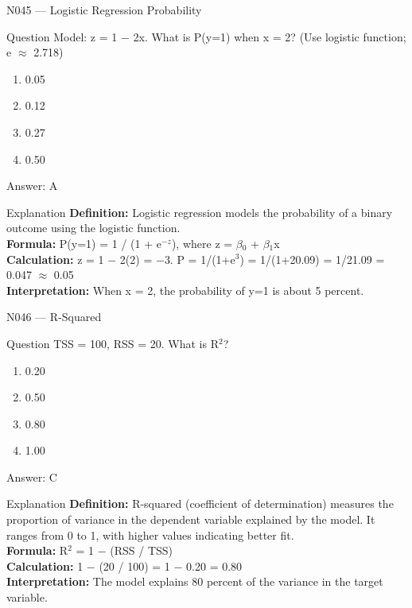 \documentclass[aspectratio=169,8pt]{beamer}
\begin{document}
	\begin{frame}{N045 --- Logistic Regression Probability}
		\begin{block}{Question}
			Model: z = 1 $-$ 2x. What is P(y=1) when x = 2? (Use logistic function; e $\approx$ 2.718)
			\begin{enumerate}
				\item 0.05
				\item 0.12
				\item 0.27
				\item 0.50
			\end{enumerate}
		\end{block}
		\begin{exampleblock}{Answer: A}\end{exampleblock}
		\begin{block}{Explanation}
			\textbf{Definition:} Logistic regression models the probability of a binary outcome using the logistic function.\\
			\textbf{Formula:} P(y=1) = 1 / (1 + e$^{-z}$), where z = $\beta$$_{0}$ + $\beta$$_{1}$x\\
			\textbf{Calculation:} z = 1 $-$ 2(2) = $-$3. P = 1/(1+e$^{3}$) = 1/(1+20.09) = 1/21.09 = 0.047 $\approx$ 0.05\\
			\textbf{Interpretation:} When x = 2, the probability of y=1 is about 5 percent.
		\end{block}
	\end{frame}
	
	\begin{frame}{N046 --- R-Squared}
		\begin{block}{Question}
			TSS = 100, RSS = 20. What is R$^{2}$?
			\begin{enumerate}
				\item 0.20
				\item 0.50
				\item 0.80
				\item 1.00
			\end{enumerate}
		\end{block}
		\begin{exampleblock}{Answer: C}\end{exampleblock}
		\begin{block}{Explanation}
			\textbf{Definition:} R-squared (coefficient of determination) measures the proportion of variance in the dependent variable explained by the model. It ranges from 0 to 1, with higher values indicating better fit.\\
			\textbf{Formula:} R$^{2}$ = 1 $-$ (RSS / TSS)\\
			\textbf{Calculation:} 1 $-$ (20 / 100) = 1 $-$ 0.20 = 0.80\\
			\textbf{Interpretation:} The model explains 80 percent of the variance in the target variable.
		\end{block}
	\end{frame}
	
\end{document}
